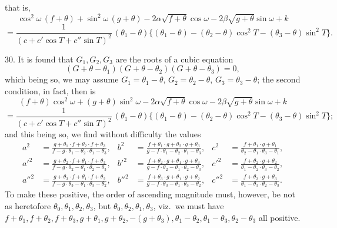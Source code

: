 \documentclass[11pt,a4paper]{article}
\begin{document}
\newpage


\noindent that is,
\[
\cos^{2}\omega\,(f + \theta) + \sin^{2}\omega\,(g + \theta) - 2\alpha\sqrt{f + \theta}\cos\omega - 2\beta\sqrt{g + \theta}\sin\omega + k
\]
\[
= \frac{1}{(c + c'\cos T + c''\sin T)^{2}}\,(\theta_{1} - \theta)\{(\theta_{1} - \theta) - (\theta_{2} - \theta)\cos^{2}T - (\theta_{3} - \theta)\sin^{2}T\}.
\]

30. It is found that $G_{1}, G_{2}, G_{3}$ are the roots of a cubic equation
\[
(G + \theta - \theta_{1})(G + \theta - \theta_{2})(G + \theta - \theta_{3}) = 0,
\]
which being so, we may assume $G_{1} = \theta_{1} - \theta$, $G_{2} = \theta_{2} - \theta$, $G_{3} = \theta_{3} - \theta$; the second condition, in fact, then is
\[
(f + \theta)\cos^{2}\omega + (g + \theta)\sin^{2}\omega - 2\alpha\sqrt{f + \theta}\cos\omega - 2\beta\sqrt{g + \theta}\sin\omega + k
\]
\[
= \frac{1}{(c + c'\cos T + c''\sin T)^{2}}\,(\theta_{1} - \theta)\{(\theta_{1} - \theta) - (\theta_{2} - \theta)\cos^{2}T - (\theta_{3} - \theta)\sin^{2}T\};
\]
and this being so, we find without difficulty the values
\begin{align*}
a^{2} &= \frac{g + \theta_{1}\cdot f + \theta_{2}\cdot f + \theta_{3}}{f - g\cdot \theta_{1} - \theta_{2}\cdot \theta_{1} - \theta_{3}}, & b^{2} &= \frac{f + \theta_{1}\cdot g + \theta_{2}\cdot g + \theta_{3}}{g - f\cdot \theta_{1} - \theta_{2}\cdot \theta_{1} - \theta_{3}}, & c^{2} &= \frac{f + \theta_{1}\cdot g + \theta_{1}}{\theta_{2} - \theta_{1}\cdot \theta_{3} - \theta_{1}},\\
a'^{2} &= \frac{g + \theta_{2}\cdot f + \theta_{1}\cdot f + \theta_{3}}{f - g\cdot \theta_{2} - \theta_{1}\cdot \theta_{2} - \theta_{3}}, & b'^{2} &= \frac{f + \theta_{2}\cdot g + \theta_{1}\cdot g + \theta_{3}}{g - f\cdot \theta_{2} - \theta_{1}\cdot \theta_{2} - \theta_{3}}, & c'^{2} &= \frac{f + \theta_{2}\cdot g + \theta_{2}}{\theta_{1} - \theta_{2}\cdot \theta_{3} - \theta_{2}},\\
a''^{2} &= \frac{g + \theta_{3}\cdot f + \theta_{1}\cdot f + \theta_{2}}{f - g\cdot \theta_{3} - \theta_{1}\cdot \theta_{3} - \theta_{2}}, & b''^{2} &= \frac{f + \theta_{3}\cdot g + \theta_{1}\cdot g + \theta_{2}}{g - f\cdot \theta_{3} - \theta_{1}\cdot \theta_{3} - \theta_{2}}, & c''^{2} &= \frac{f + \theta_{3}\cdot g + \theta_{3}}{\theta_{1} - \theta_{3}\cdot \theta_{2} - \theta_{3}}.
\end{align*}
To make these positive, the order of ascending magnitude must, however, be not as heretofore $\theta_{0}, \theta_{1}, \theta_{2}, \theta_{3}$, but $\theta_{0}, \theta_{2}, \theta_{1}, \theta_{3}$, viz.\ we must have $f + \theta_{1}, f + \theta_{2}, f + \theta_{3}, g + \theta_{1}, g + \theta_{2}, -(g + \theta_{3}), \theta_{1} - \theta_{2}, \theta_{1} - \theta_{3}, \theta_{2} - \theta_{3}$ all positive.
\end{document}
